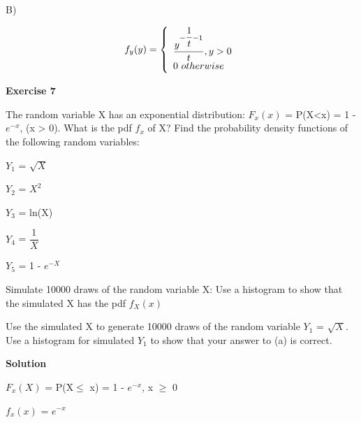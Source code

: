 \documentclass[12pt]{article}
\theoremstyle{definiton}
\theoremstyle{definition}
\theoremstyle{definition}
\let\leq\leqslant
\let\geq\geqslant
\begin{document}
B)
\medskip

\[f_y(y) = \left\{
\begin{array}{l l}
  \dfrac{y^{-\dfrac{1}{t}-1}}{t}, y > 0\\
  0\ otherwise
\end{array} \right.\]
		

		
		\bigskip
		
		\bigskip
		
		\textbf{Exercise 7}		
		\medskip

The random variable X has an exponential distribution:
$F_x(x)$ = P(X<x) = 1 - $e^{-x}$, (x > 0). What is the pdf $f_x$ of X? Find the probability density functions of the following random variables:
\medskip

\begin{list}{) ~}{}
	\item $Y_1$ = $\sqrt{X}$
	\item $Y_2$ = $X^2$
	\item $Y_3$ = ln(X)
	\item $Y_4$ = $\dfrac{1}{X}$
	\item $Y_5$ = 1 - $e^{-X}$
	\item Simulate 10000 draws of the random variable X: Use a histogram to show that the
simulated X has the pdf $f_X(x)$
	\item Use the simulated X to generate 10000 draws of the random variable $Y_1$ = $\sqrt{X}$.
Use a histogram for simulated $Y_1$ to show that your answer to (a) is correct.
\end{list}
		
\textbf{Solution}
\medskip

$F_x(X)$ = P(X$\leq$ x) = 1 - $e^{-x}$,
x $\geq$ 0
\medskip

$f_x(x)$ = $e^{-x}$
\bigskip
\end{document}
